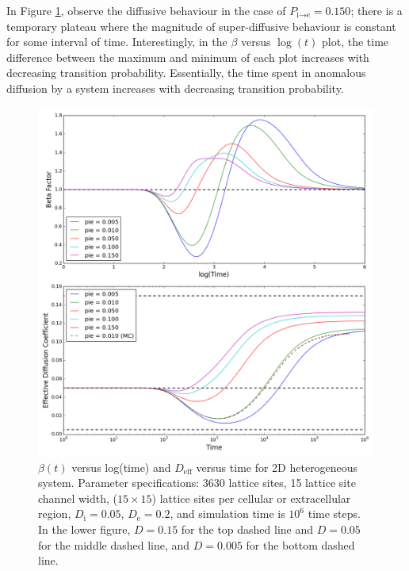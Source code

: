 	In Figure \ref{fig:pie_beta_deff_2D}, observe the diffusive behaviour in the case of $ P_{\textrm{i} \rightarrow \textrm{e}}  = 0.150 $; there is a temporary plateau where the magnitude of super-diffusive behaviour is constant for some interval of time. Interestingly, in the $ \beta $ versus $ \log(t) $ plot, the time difference between the maximum and minimum of each plot increases with decreasing transition probability. Essentially, the time spent in anomalous diffusion by a system increases with decreasing transition probability.
	
	\begin{figure}[h!]
		\centering
		\includegraphics[width=1.0\linewidth]{../images/2D/pie_beta_deff_2D}
		\caption[2D: $ \beta (t) $ and $ D_\textrm{eff} $ for varying boundary transition probabilities]{$ \beta (t) $ versus log(time) and $ D_\textrm{eff} $ versus time for 2D heterogeneous system. Parameter specifications: 3630 lattice sites, 15 lattice site channel width, ($ 15 \times 15 $) lattice sites per cellular or extracellular region, $ D_\textrm{i} = 0.05 $, $ D_\textrm{e} = 0.2 $, and simulation time is $ 10^6 $ time steps. In the lower figure, $ D = 0.15 $ for the top dashed line and $ D = 0.05 $ for the middle dashed line, and $ D = 0.005 $ for the bottom dashed line.}
		\label{fig:pie_beta_deff_2D}
	\end{figure}

